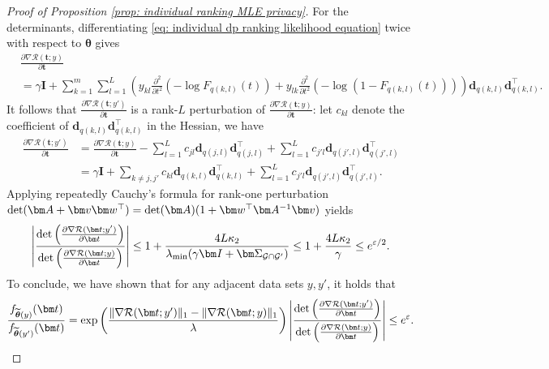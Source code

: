 \documentclass[letterpaper,12pt]{article}
\numberwithin{equation}{section}
\theoremstyle{plain}
\numberwithin{Theorem}{section}
\numberwithin{corollary}{section}
\numberwithin{proposition}{section}
\numberwithin{Lemma}{section}
{
	\theoremstyle{definition}
	\newtheorem{Definition}{Definition}
	\newtheorem{example}{Example}
	\numberwithin{example}{section}
	\newtheorem{fact}{Fact}
	\numberwithin{fact}{section}
	\newtheorem{remark}{Remark}
}
\newcommand{\1}{\mathbbm{1}}
\def\bth{{\boldsymbol{\theta}}}
\def\det{{\rm det}}
\begin{document}
\begin{proof}[Proof of Proposition \ref{prop: individual ranking MLE privacy}]
	For the determinants, differentiating \eqref{eq: individual dp ranking likelihood equation} twice with respect to $\bth$ gives
	\begin{align*}
		&\frac{\partial \nabla \mathcal R(\bm t; y)}{\partial\bm t} \\
		&= \gamma \bm I + \sum_{k=1}^m \sum_{l=1}^L \left(y_{kl}\frac{\partial^2}{\partial t^2}(-\log F_{q(k, l)}(t))+ y_{lk}\frac{\partial^2}{\partial t^2}(-\log (1-F_{q(k, l)}(t)))\right)\bm d_{q(k, l)}\bm d_{q(k, l)}^\top.
	\end{align*}
	It follows that $\frac{\partial \nabla \mathcal R(\bm t; y')}{\partial\bm t}$ is a rank-$L$ perturbation of $\frac{\partial \nabla \mathcal R(\bm t; y)}{\partial\bm t}$: let $c_{kl}$ denote the coefficient of $\bm d_{q(k, l)}\bm d_{q(k, l)}^\top$ in the Hessian, we have
	\begin{align*}
		\frac{\partial \nabla \mathcal R(\bm t; y')}{\partial\bm t} &= \frac{\partial \nabla \mathcal R(\bm t; y)}{\partial\bm t} - \sum_{l=1}^L c_{jl} \bm d_{q(j, l)}\bm d_{q(j, l)}^\top +  \sum_{l=1}^L c_{j'l} \bm d_{q(j', l)}\bm d_{q(j', l)}^\top \\
		&= \gamma \bm I + \sum_{k \neq j, j'} c_{kl} \bm d_{q(k, l)}\bm d_{q(k, l)}^\top +  \sum_{l=1}^L c_{j'l} \bm d_{q(j', l)}\bm d_{q(j', l)}^\top.
	\end{align*}
	Applying repeatedly Cauchy's formula for rank-one perturbation $\det(\bm A + \bm v \bm w^\top) = \det(\bm A) (1 + \bm w^\top \bm A^{-1} \bm v)$ yields
	\begin{align*}
		\left|\frac{\det \left(\frac{\partial \nabla \mathcal R(\bm t; y')}{\partial\bm t}\right)}{\det \left(\frac{\partial \nabla \mathcal R(\bm t; y)}{\partial\bm t}\right)}\right| \leq 1 +  \frac{4L\kappa_2}{\lambda_{\min}(\gamma\bm I + \bm 
			\Sigma_{\mathcal G \cap \mathcal G'})} \leq 1 + \frac{4L\kappa_2}{\gamma} \leq e^{\varepsilon/2}.
	\end{align*}
	To conclude, we have shown that for any adjacent data sets $y, y'$, it holds that
	\begin{align*}
		\frac{f_{\widetilde\bth(y)}(\bm t)}{f_{\widetilde\bth(y')}(\bm t)} = \exp\left(\frac{\|\nabla \mathcal R(\bm t; y')\|_1 - \|\nabla \mathcal R(\bm t; y)\|_1 }{\lambda}\right) \left|\frac{\det \left(\frac{\partial \nabla \mathcal R(\bm t; y')}{\partial\bm t}\right)}{\det \left(\frac{\partial \nabla \mathcal R(\bm t; y)}{\partial\bm t}\right)}\right| \leq e^{\varepsilon}.
	\end{align*}
\end{proof}
\end{document}
